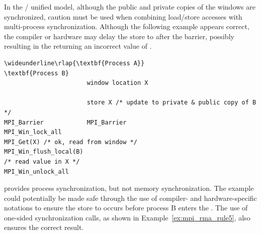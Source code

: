 \begin{example}
\label{ex:mpi_rma_rule5_unified}
%
In the \RMA/ unified model, although the public and private copies
of the windows are synchronized, caution must be used when
combining load/store accesses with multi-process synchronization.
Although the following example appears correct, the compiler or
hardware may delay the store to  after the barrier, possibly
resulting in the  returning
an incorrect value 
of .

\begin{Verbatim}[commandchars=\\\{\}]
\wideunderline\rlap{\textbf{Process A}}                       \textbf{Process B}
                       window location X

                       store X /* update to private & public copy of B */
MPI_Barrier            MPI_Barrier
MPI_Win_lock_all
MPI_Get(X) /* ok, read from window */
MPI_Win_flush_local(B)
/* read value in X */
MPI_Win_unlock_all
\end{Verbatim}
\lstset{fancyvrb=false}
 provides process synchronization, but not
memory
synchronization.  The example could potentially be made safe through the use
of compiler- and
hardware-specific notations to ensure the
store to  occurs 
before process B enters the .  The use of one-sided
synchronization calls, as shown in Example~\ref{ex:mpi_rma_rule5}, also ensures
the correct result.

\end{example}


